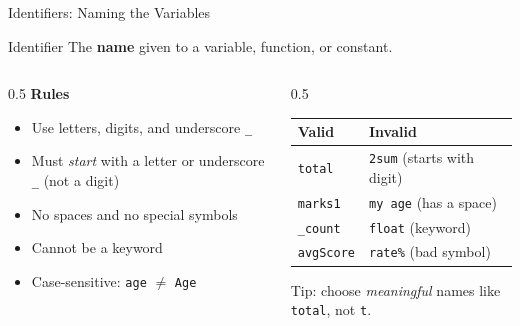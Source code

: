 \documentclass[aspectratio=169]{beamer}
\begin{document}
	\begin{frame}{Identifiers: Naming the Variables}
		\begin{block}{Identifier}
			The \textbf{name} given to a variable, function, or constant.
		\end{block}
		\vspace*{0.3cm}
		\begin{columns}[T]
			\begin{column}{0.5\textwidth}
				\textbf{Rules}
				\begin{itemize}
					\item Use letters, digits, and underscore \texttt{\_}
					\item Must \emph{start} with a letter or underscore \texttt{\_} (not a digit)
					\item No spaces and no special symbols
					\item Cannot be a keyword
					\item Case-sensitive: \texttt{age} $\neq$ \texttt{Age}
				\end{itemize}
			\end{column}
			\begin{column}{0.5\textwidth}
				\renewcommand{\arraystretch}{1.25}
				\centering
				\begin{tabular}{@{}ll@{}}
					\toprule
					\textbf{Valid} & \textbf{Invalid} \\
					\midrule
					\texttt{total}    & \texttt{2sum} (starts with digit) \\
					\texttt{marks1}   & \texttt{my age} (has a space) \\
					\texttt{\_count}  & \texttt{float} (keyword) \\
					\texttt{avgScore} & \texttt{rate\%} (bad symbol) \\
					\bottomrule
				\end{tabular}
				\vspace{0.2cm}
				
				\footnotesize Tip: choose \emph{meaningful} names like \texttt{total}, not \texttt{t}.
			\end{column}
		\end{columns}
	\end{frame}
	
\end{document}
